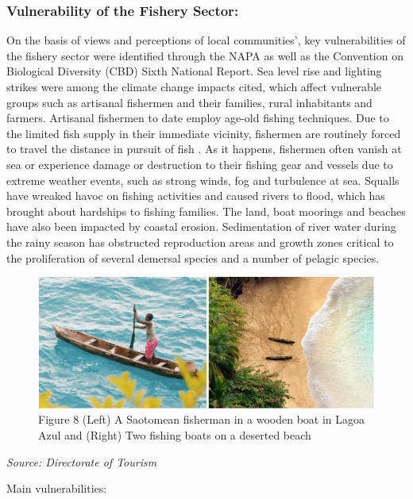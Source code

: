 \documentclass[
]{book}
\begin{document}
\hypertarget{vulnerability-of-the-fishery-sector}{%
\subsubsection{Vulnerability of the Fishery Sector:}\label{vulnerability-of-the-fishery-sector}}

On the basis of views and perceptions of local communities', key vulnerabilities of the fishery sector were identified through the NAPA as well as the Convention on Biological Diversity (CBD) Sixth National Report. Sea level rise and lighting strikes were among the climate change impacts cited, which affect vulnerable groups such as artisanal fishermen and their families, rural inhabitants and farmers. Artisanal fishermen to date employ age-old fishing techniques. Due to the limited fish supply in their immediate vicinity, fishermen are routinely forced to travel the distance in pursuit of fish . As it happens, fishermen often vanish at sea or experience damage or destruction to their fishing gear and vessels due to extreme weather events, such as strong winds, fog and turbulence at sea. Squalls have wreaked havoc on fishing activities and caused rivers to flood, which has brought about hardships to fishing families. The land, boat moorings and beaches have also been impacted by coastal erosion. Sedimentation of river water during the rainy season has obstructed reproduction areas and growth zones critical to the proliferation of several demersal species and a number of pelagic species.

\begin{figure}
\centering
\includegraphics{images/tourism.png}
\caption{Figure 8 (Left) A Saotomean fisherman in a wooden boat in Lagoa Azul and (Right) Two fishing boats on a deserted beach}
\end{figure}

\emph{Source: Directorate of Tourism }

Main vulnerabilities:
\end{document}
